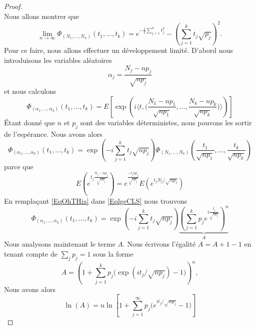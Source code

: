 \begin{proof}
\begin{subequations}
    \end{subequations}
    Nous allons montrer que 
    \begin{equation}
        \lim_{n\to \infty} \Phi_{(N_1,\ldots, N_n)}(t_1,\ldots, t_k)= e^{-\frac{ 1 }{2}\sum_{j=1}^nt_j^2}-\left( \sum_{j=1}^kt_j\sqrt{p_j} \right)^2.
    \end{equation}
    Pour ce faire, nous allons effectuer un développement limité. D'abord nous introduisons les variables aléatoires
    \begin{equation}        \label{EqmdROCD}
        \alpha_j=\frac{ N_j-np_j }{ \sqrt{np_j} }
    \end{equation}
    et nous calculons
    \begin{equation}
        \Phi_{(\alpha_1,\ldots, \alpha_k)}(t_1,\ldots, t_k)=E\left[ \exp\left( i\langle t, \big( \frac{ N_1-np_1 }{ \sqrt{np_1} },\ldots, \frac{ N_k-np_k }{ \sqrt{np_k} } \big)\rangle  \right) \right]
    \end{equation}
    Étant donné que \( n\) et \( p_j\) sont des variables déterministes, nous pouvons les sortir de l'espérance. Nous avons alors
    \begin{equation}        \label{EqlgeCLS}
        \Phi_{(\alpha_1,\ldots, \alpha_k)}(t_1,\ldots, t_k)= \exp\left( -i\sum_{j=1}^kt_j\sqrt{np_j} \right)\Phi_{(N_1,\ldots, N_k)}\left( \frac{ t_1 }{ \sqrt{np_1} },\ldots, \frac{ t_k }{ \sqrt{np_k} } \right)
    \end{equation}
    parce que
    \begin{equation}
        E\left(  e^{t_j\frac{ N_j-np_j }{ \sqrt{np_j} }} \right)= e^{\frac{ -t_jnp_j }{ \sqrt{np_j} }}E\left(  e^{t_jN_j/\sqrt{np_j}} \right)
    \end{equation}
    En remplaçant \eqref{EqOhTHia} dans \eqref{EqlgeCLS} nous trouvons
    \begin{equation}        \label{EqrUYsnD}
        \Phi_{(\alpha_1,\ldots, \alpha_k)}(t_1,\ldots, t_k)=\exp\left( -i\sum_{j=1}^kt_j\sqrt{np_j} \right)\underbrace{\left( \sum_{j=1}^kp_j e^{i\frac{ t_j }{ \sqrt{np_j} }} \right)^n}_{A}
    \end{equation}
    Nous analysons maintenant le terme $A$. Nous écrivons l'égalité \( A=A+1-1\) en tenant compte de $\sum_{j}p_j=1$ sous la forme
    \begin{equation}
        A=\left( 1+\sum_{j=1}^kp_j\big( \exp(it_j/\sqrt{np_j})-1 \big) \right)^n,
    \end{equation}
    Nous avons alors 
    \begin{equation}
        \ln(A)=n\ln\left[ 1+\sum_{j=1}^{\infty}p_j\big( e^{ it_j/\sqrt{np_j}}-1) \right]

\end{equation}
\end{proof}
